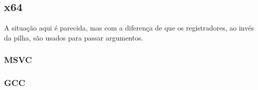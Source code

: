 \subsection{x64}

A situação aqui é parecida, mas com a diferença de que os registradores, ao invés da pilha, são usados para passar argumentos.

\subsubsection{MSVC}



\ifdefined\IncludeGCC
\subsubsection{GCC}


\fi
